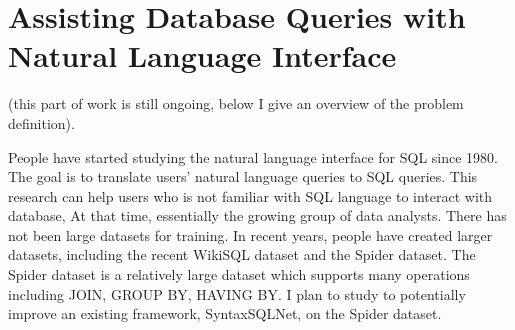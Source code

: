 
\chapter{Assisting Database Queries with Natural Language Interface}
\label{ch:nl2sql}

(this part of work is still ongoing, below I give an overview of the problem definition). 

People have started studying the natural language interface for SQL since 1980. The goal is to translate users' natural language queries to SQL queries. This research can help users who is not familiar with SQL language to interact with database, At that time, essentially the growing group of data analysts. There has not been large datasets for training. In recent years, people have created larger datasets, including the recent WikiSQL dataset and the Spider dataset. The Spider dataset is a relatively large dataset which supports many operations including JOIN, GROUP BY, HAVING BY. I plan to study to potentially improve an existing framework, SyntaxSQLNet, on the Spider dataset. 